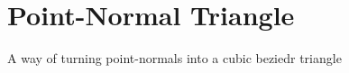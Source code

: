 
\section{Point-Normal Triangle}
A way of turning point-normals into a cubic beziedr triangle\cite{pointnormal}
